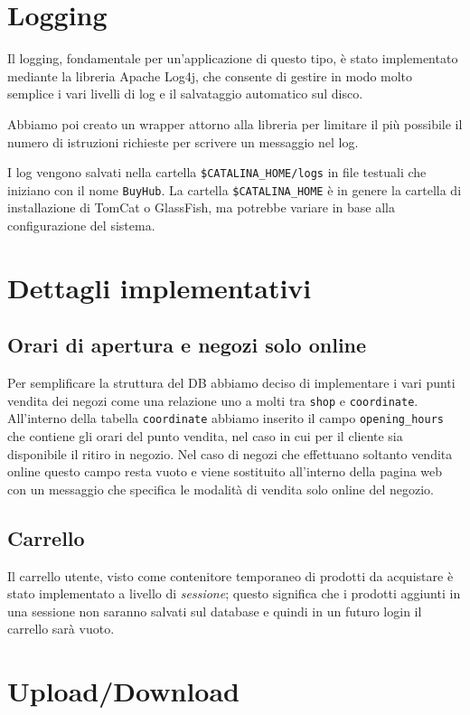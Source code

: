 \chapter{Logging}
Il logging, fondamentale per un'applicazione di questo tipo, è stato implementato mediante la libreria Apache Log4j, che consente di gestire in modo molto semplice i vari livelli di log e il salvataggio automatico sul disco.

Abbiamo poi creato un wrapper attorno alla libreria per limitare il più possibile il numero di istruzioni richieste per scrivere un messaggio nel log.

I log vengono salvati nella cartella \texttt{\$CATALINA\_HOME/logs} in file testuali che iniziano con il nome \texttt{BuyHub}.
La cartella \texttt{\$CATALINA\_HOME} è in genere la cartella di installazione di TomCat o GlassFish, ma potrebbe variare in base alla configurazione del sistema.

\chapter{Dettagli implementativi}

\section{Orari di apertura e negozi solo online}
Per semplificare la struttura del DB abbiamo deciso di implementare i vari punti vendita dei negozi come una relazione uno a molti tra \texttt{shop} e \texttt{coordinate}. All'interno della tabella \texttt{coordinate} abbiamo inserito il campo \texttt{opening\_hours} che contiene gli orari del punto vendita, nel caso in cui per il cliente sia disponibile il ritiro in negozio. Nel caso di negozi che effettuano soltanto vendita online questo campo resta vuoto e viene sostituito all'interno della pagina web con un messaggio che specifica le modalità di vendita solo online del negozio.

\section{Carrello}
Il carrello utente, visto come contenitore temporaneo di prodotti da acquistare è stato implementato a livello di \textit{sessione}; questo significa che i prodotti aggiunti in una sessione non saranno salvati sul database e quindi in un futuro login il carrello sarà vuoto.

\chapter{Upload/Download}

